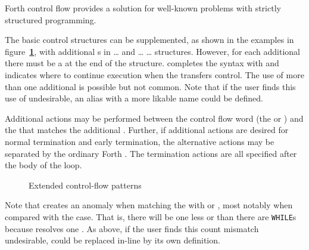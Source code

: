 Forth control flow provides a solution for well-known problems with
strictly structured programming.

The basic control structures can be supplemented, as shown in the
examples in figure~\textbf{\ref{fig:extended}}, with additional
s in  {\ldots}  and 
{\ldots}  {\ldots}  structures. However, for
each additional  there must be a  at the end
of the structure.  completes the syntax with 
and indicates where to continue execution when the 
transfers control. The use of more than one additional 
is possible but not common. Note that if the user finds this use of
 undesirable, an alias with a more likable name could be
defined.

Additional actions may be performed between the control flow word (the
 or ) and the  that matches the
additional . Further, if additional actions are desired
for normal termination and early termination, the alternative actions
may be separated by the ordinary Forth . The termination
actions are all specified after the body of the loop.

\begin{figure}[ht]
  \begin{center}
	\caption{Extended control-flow patterns}
	\label{fig:extended}
  \end{center}
\end{figure}

Note that  creates an anomaly when matching the
 with  or , most notably when
compared with the  case. That is,
there will be one less  or  than there are
\texttt{WHILE}s because  resolves one . As
above, if the user finds this count mismatch undesirable, 
could be replaced in-line by its own definition.

